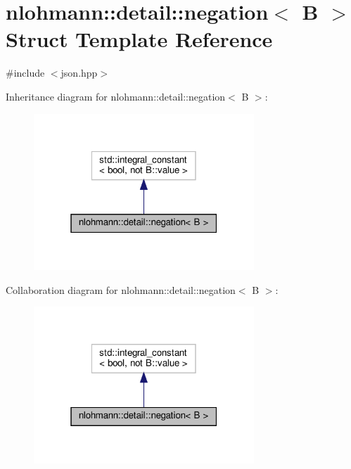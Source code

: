 \hypertarget{structnlohmann_1_1detail_1_1negation}{}\section{nlohmann\+:\+:detail\+:\+:negation$<$ B $>$ Struct Template Reference}
\label{structnlohmann_1_1detail_1_1negation}


{\ttfamily \#include $<$json.\+hpp$>$}



Inheritance diagram for nlohmann\+:\+:detail\+:\+:negation$<$ B $>$\+:
\nopagebreak
\begin{figure}[H]
\begin{center}
\leavevmode
\includegraphics[width=235pt]{structnlohmann_1_1detail_1_1negation__inherit__graph}
\end{center}
\end{figure}


Collaboration diagram for nlohmann\+:\+:detail\+:\+:negation$<$ B $>$\+:
\nopagebreak
\begin{figure}[H]
\begin{center}
\leavevmode
\includegraphics[width=235pt]{structnlohmann_1_1detail_1_1negation__coll__graph}
\end{center}
\end{figure}



